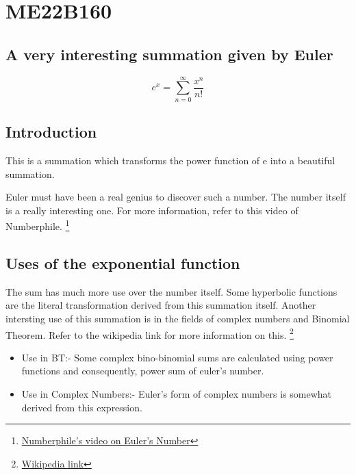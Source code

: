 \section{ME22B160}
\subsection{A very interesting summation given by Euler}
\begin{equation}
    e^x = \sum_{n=0}^{\infty} \frac{x^n}{n!}
\end{equation}
\subsection{Introduction}
This is a summation which transforms the power function of e into a beautiful summation.

Euler must have been a real genius to discover such a number. The number itself is a really interesting one. For more information, refer to this video of Numberphile. \footnote{\href{https://www.youtube.com/watch?v=AuA2EAgAegE}{Numberphile's video on Euler's Number}}
\subsection{Uses of the exponential function}
The sum has much more use over the number itself. Some hyperbolic functions are the literal transformation derived from this summation itself. Another intersting use of this summation is in the fields of complex numbers and Binomial Theorem. Refer to the wikipedia link for more information on this. \footnote{\href{https://en.wikipedia.org/wiki/Exponential_function}{Wikipedia link}}
\begin{itemize}
    \item Use in BT:- Some complex bino-binomial sums are calculated using power functions and consequently, power sum of euler's number.
    \item Use in Complex Numbers:- Euler's form of complex numbers is somewhat derived from this expression.
\end{itemize}